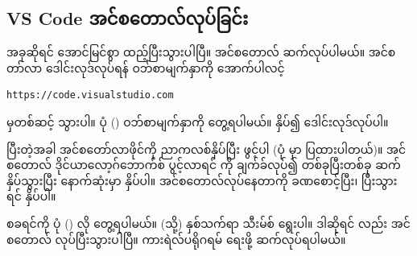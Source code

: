 \begin{figure}[tbh!]
\caption{} 
\label{fig:pycmdchk}
\end{figure}

\clearpage
\subsection*{VS Code အင်စတောလ်လုပ်ခြင်း}\label{sec:vscode}
အခုဆိုရင်  အောင်မြင်စွာ ထည့်ပြီးသွားပါပြီ။  အင်စတောလ် ဆက်လုပ်ပါမယ်။ အင်စတာ်လာ ဒေါင်းလုဒ်လုပ်ရန် ဝဘ်စာမျက်နှာကို အောက်ပါလင့်
%
\begin{verbatim}
https://code.visualstudio.com 
\end{verbatim}
%
မှတစ်ဆင့် သွားပါ။ ပုံ (\fRefNo{\ref{fig:vsdwnpg}}) ဝဘ်စာမျက်နှာကို တွေ့ရပါမယ်။  နှိပ်၍ ဒေါင်းလုဒ်လုပ်ပါ။

ပြီးတဲ့အခါ အင်စတော်လာဖိုင်ကို ညာကလစ်နှိပ်ပြီး ဖွင့်ပါ (ပုံ \fRefNo{\ref{fig:vsinstlropn}} မှာ ပြထားပါတယ်)။ အင်စတောလ် ဒိုင်ယာလော့ဂ်ဘောက်စ် ပွင့်လာရင်  ကို ချက်ခ်လုပ်၍  တစ်ခုပြီးတစ်ခု ဆက်နှိပ်သွားပြီး နောက်ဆုံးမှာ   နှိပ်ပါ။ အင်စတောလ်လုပ်နေတာကို ခဏစောင့်ပြီး၊ ပြီးသွားရင်  နှိပ်ပါ။  

 စခရင်ကို ပုံ (\fRefNo{\ref{fig:vswlcm}}) လို တွေ့ရပါမယ်။  (သို့)  နှစ်သက်ရာ သီးမ်စ် ရွေးပါ။ ဒါဆိုရင်  လည်း အင်စတောလ် လုပ်ပြီးသွားပါပြီ။ ကားရဲလ်ပရိုဂရမ် ရေးဖို့ ဆက်လုပ်ရပါမယ်။

